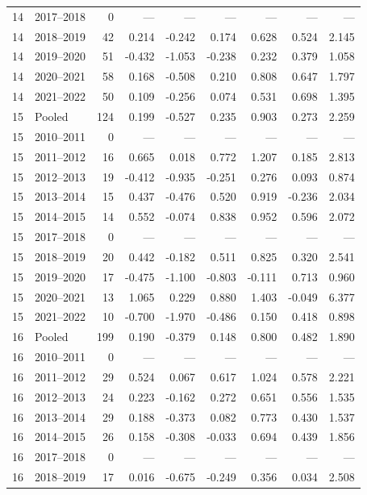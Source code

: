 \begin{longtable}{llrrrrrrr}
14 & 2017--2018 & 0 & --- & --- & --- & --- & --- & --- \\
14 & 2018--2019 & 42 & 0.214 & -0.242 & 0.174 & 0.628 & 0.524 & 2.145 \\
14 & 2019--2020 & 51 & -0.432 & -1.053 & -0.238 & 0.232 & 0.379 & 1.058 \\
14 & 2020--2021 & 58 & 0.168 & -0.508 & 0.210 & 0.808 & 0.647 & 1.797 \\
14 & 2021--2022 & 50 & 0.109 & -0.256 & 0.074 & 0.531 & 0.698 & 1.395 \\
15 & Pooled & 124 & 0.199 & -0.527 & 0.235 & 0.903 & 0.273 & 2.259 \\
15 & 2010--2011 & 0 & --- & --- & --- & --- & --- & --- \\
15 & 2011--2012 & 16 & 0.665 & 0.018 & 0.772 & 1.207 & 0.185 & 2.813 \\
15 & 2012--2013 & 19 & -0.412 & -0.935 & -0.251 & 0.276 & 0.093 & 0.874 \\
15 & 2013--2014 & 15 & 0.437 & -0.476 & 0.520 & 0.919 & -0.236 & 2.034 \\
15 & 2014--2015 & 14 & 0.552 & -0.074 & 0.838 & 0.952 & 0.596 & 2.072 \\
15 & 2017--2018 & 0 & --- & --- & --- & --- & --- & --- \\
15 & 2018--2019 & 20 & 0.442 & -0.182 & 0.511 & 0.825 & 0.320 & 2.541 \\
15 & 2019--2020 & 17 & -0.475 & -1.100 & -0.803 & -0.111 & 0.713 & 0.960 \\
15 & 2020--2021 & 13 & 1.065 & 0.229 & 0.880 & 1.403 & -0.049 & 6.377 \\
15 & 2021--2022 & 10 & -0.700 & -1.970 & -0.486 & 0.150 & 0.418 & 0.898 \\
16 & Pooled & 199 & 0.190 & -0.379 & 0.148 & 0.800 & 0.482 & 1.890 \\
16 & 2010--2011 & 0 & --- & --- & --- & --- & --- & --- \\
16 & 2011--2012 & 29 & 0.524 & 0.067 & 0.617 & 1.024 & 0.578 & 2.221 \\
16 & 2012--2013 & 24 & 0.223 & -0.162 & 0.272 & 0.651 & 0.556 & 1.535 \\
16 & 2013--2014 & 29 & 0.188 & -0.373 & 0.082 & 0.773 & 0.430 & 1.537 \\
16 & 2014--2015 & 26 & 0.158 & -0.308 & -0.033 & 0.694 & 0.439 & 1.856 \\
16 & 2017--2018 & 0 & --- & --- & --- & --- & --- & --- \\
16 & 2018--2019 & 17 & 0.016 & -0.675 & -0.249 & 0.356 & 0.034 & 2.508 \\

\end{longtable}
